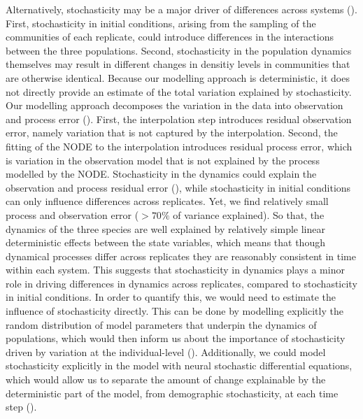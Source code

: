 \documentclass[11pt, oneside]{article}
\begin{document}
Alternatively, stochasticity may be a major driver of differences across systems (\cite{Dallas2021}). 
First, stochasticity in initial conditions, arising from the sampling of the communities of each replicate, could introduce differences in the interactions between the three populations.
Second, stochasticity in the population dynamics themselves may result in different changes in densitiy levels in communities that are otherwise identical.
Because our modelling approach is deterministic, it does not directly provide an estimate of the total variation explained by stochasticity.
Our modelling approach decomposes the variation in the data into observation and process error (\cite{Calder2003}). 
First, the interpolation step introduces residual observation error, namely variation that is not captured by the interpolation.
Second, the fitting of the NODE to the interpolation introduces residual process error, which is variation in the observation model that is not explained by the process modelled by the NODE.
Stochasticity in the dynamics could explain the observation and process residual error (\cite{Calder2003}), while stochasticity in initial conditions can only influence differences across replicates.
Yet, we find relatively small process and observation error ($>70\%$ of variance explained).
So that, the dynamics of the three species are well explained by relatively simple linear deterministic effects between the state variables, which means that though dynamical processes differ across replicates they are reasonably consistent in time within each system. 
This suggests that stochasticity in dynamics plays a minor role in driving differences in dynamics across replicates, compared to stochasticity in initial conditions. 
In order to quantify this, we would need to estimate the influence of stochasticity directly. 
This can be done by modelling explicitly the random distribution of model parameters that underpin the dynamics of populations, which would then inform us about the importance of stochasticity driven by variation at the individual-level (\cite{Fox2002}).
Additionally, we could model stochasticity explicitly in the model with neural stochastic differential equations, which would allow us to separate the amount of change explainable by the deterministic part of the model, from demographic stochasticity, at each time step (\cite{Jia2019}).
\end{document}

